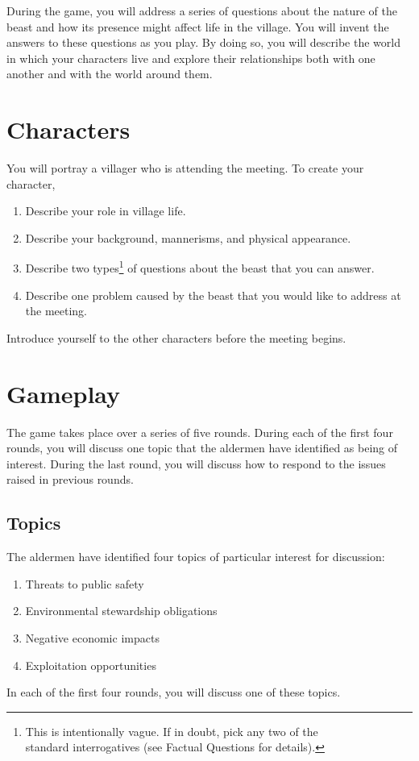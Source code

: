 \documentclass[a6paper, 11pt, parskip=half, DIV=15]{scrartcl}
\begin{document}
During the game, you will address a series of questions about the nature of the beast and how its presence might affect life in the village. You will invent the answers to these questions as you play. By doing so, you will describe the world in which your characters live and explore their relationships both with one another and with the world around them.

\newpage
\enlargethispage{1.75\baselineskip}

\section*{Characters}
You will portray a villager who is attending the meeting. To create your character,
\begin{enumerate}[nosep]
	\item Describe your role in village life.
	\item Describe your background, mannerisms, and physical appearance.
	\item Describe two types\footnote[1]{This is intentionally vague. If in doubt, pick any two of the\\standard interrogatives (see {\setmainfont{EBGaramond-SemiboldItalic}Factual Questions} for details).} of questions about the beast that you can answer.
	\item Describe one problem caused by the beast that you would like to address at the meeting.
\end{enumerate}
Introduce yourself to the other characters before the meeting begins.

\section*{Gameplay}
The game takes place over a series of five rounds. 
During each of the first four rounds, you will discuss one topic that the aldermen have identified as being of interest.
During the last round, you will discuss how to respond to the issues raised in previous rounds. 

\newpage
\enlargethispage{1.75\baselineskip}

\subsection*{Topics}
The aldermen have identified four topics of particular interest for discussion:
\begin{enumerate}[nosep]
	\item Threats to public safety
	\item Environmental stewardship obligations
	\item Negative economic impacts
	\item Exploitation opportunities
\end{enumerate}
In each of the first four rounds, you will discuss one of these topics.
\end{document}
